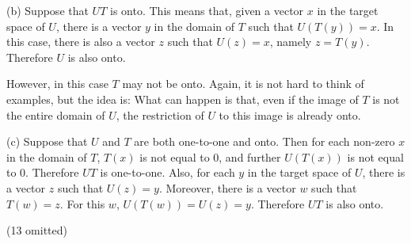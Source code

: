 \documentclass[12pt]{amsart}
\begin{document}
(b) Suppose that $UT$ is onto.  This means that, given a vector $x$ in the target space of $U$, there is a vector $y$ in the domain of $T$ such that $U(T(y))=x$.  In this case, there is also a vector $z$ such that $U(z)=x$, namely $z=T(y)$.  Therefore $U$ is also onto.

However, in this case $T$ may not be onto.  Again, it is not hard to think of examples, but the idea is: What can happen is that, even if the image of $T$ is not the entire domain of $U$, the restriction of $U$ to this image is already onto.

(c) Suppose that $U$ and $T$ are both one-to-one and onto.  Then for each non-zero $x$ in the domain of $T$, $T(x)$ is not equal to $0$, and further $U(T(x))$ is not equal to $0$.  Therefore $UT$ is one-to-one.  Also, for each $y$ in the target space of $U$, there is a vector $z$ such that $U(z) = y$.  Moreover, there is a vector $w$ such that $T(w)=z$.  For this $w$, $U(T(w))=U(z)=y$.  Therefore $UT$ is also onto.

\vspace{1pc}

(13 omitted)
\end{document}
